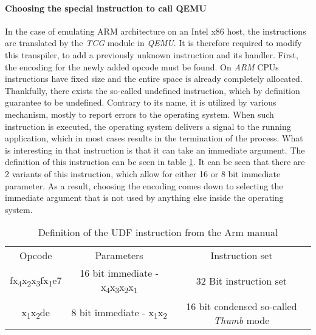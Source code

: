 \paragraph{Choosing the special instruction to call QEMU}
In the case of emulating ARM architecture on an Intel x86 host, the instructions are translated by the \textit{TCG} module in \textit{QEMU}. It is therefore required to modify this transpiler, to add a previously unknown instruction and its handler. First, the encoding for the newly added opcode must be found. On \textit{ARM} CPUs instructions have fixed size and the entire space is already completely allocated. Thankfully, there exists the so-called undefined instruction, which by definition guarantee to be undefined. Contrary to its name, it is utilized by various mechanism, mostly to report errors to the operating system. When such instruction is executed, the operating system delivers a signal to the running application, which in most cases results in the termination of the process. What is interesting in that instruction is that it can take an immediate argument. The definition of this instruction can be seen in table \ref{tab:armudf}. It can be seen that there are 2 variants of this instruction, which allow for either 16 or 8 bit immediate parameter. As a result, choosing the encoding comes down to selecting the immediate argument that is not used by anything else inside the operating system. 

\begin{table}[h!]
    \centering
    \begin{tabular}{c|c|c}
        Opcode & Parameters & Instruction set \\
        fx\textsubscript{4}x\textsubscript{2}x\textsubscript{3}fx\textsubscript{1}e7 & 16 bit immediate - x\textsubscript{4}x\textsubscript{3}x\textsubscript{2}x\textsubscript{1} & 32 Bit instruction set \\

        x\textsubscript{1}x\textsubscript{2}de & 8 bit immediate - x\textsubscript{1}x\textsubscript{2} & 16 bit condensed so-called \textit{Thumb} mode \\
    \end{tabular}
    \caption{Definition of the UDF instruction from the Arm manual}
    \label{tab:armudf}
\end{table}

